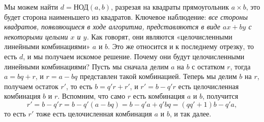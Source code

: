 \documentclass{article}
\begin{document}
\newline
\newline
Мы можем найти $d = \text{НОД}(a, b)$, разрезая на квадраты прямоугольник $a \times b$, это будет сторона наименьшего из квадратов. Ключевое наблюдение: \textit{все стороны квадратов, появляющиеся в ходе алгоритма, представляются в виде $ax + by$ с некоторыми целыми $x$ и $y$.} Как говорят, они являются «целочисленными линейными комбинациями» $a$ и $b$. Это же относится и к последнему отрезку, то есть $d$, и мы получаем искомое решение.
\newline
Почему они будут целочисленными линейными комбинациями? Пусть мы сначала делим $a$ на $b$ с остатком $r$, тогда $a = bq+r$, и $r = a-bq$ представлен такой комбинацией. Теперь мы делим $b$ на $r$, получаем остаток $r'$, то есть $b = q'r + r'$, и $r' = b - q'r$ есть целочисленная комбинация $b$ и $r$. Вспомним, что само $r$ есть комбинация $a$ и $b$, получится
\[
r' = b - q'r = b - q'(a-bq) = b - q'a + q'bq = (qq' + 1)b - q'a,
\]
то есть $r'$ тоже есть целочисленная комбинация $a$ и $b$, и так далее.
\end{document}
